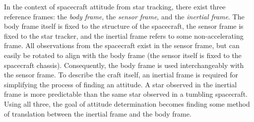 In the context of spacecraft attitude from star tracking, there exist three reference frames: the \textit{body frame},
the \textit{sensor frame}, and the \textit{inertial frame}.
The body frame itself is fixed to the structure of the spacecraft, the sensor frame is fixed to the star tracker,
and the inertial frame refers to some non-accelerating frame.
All observations from the spacecraft exist in the sensor frame, but can easily be rotated to align with the body frame
(the sensor itself is fixed to the spacecraft chassis).
Consequently, the body frame is used interchangeably with the sensor frame.
To describe the craft itself, an inertial frame is required for simplifying the process of finding an attitude.
A star observed in the inertial frame is more predictable than the same star observed in a tumbling spacecraft.
Using all three, the goal of attitude determination becomes finding some method of translation between the inertial
frame and the body frame.

